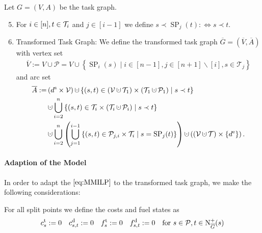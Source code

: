 \begin{definition}
Let $G=(V,A)$ be the task graph.
\begin{enumerate}
	\setcounter{enumi}{4}
	\item{For $i\in[n], t\in\mathcal{T}_i$ and $j\in[i-1]$ we define ${s\prec\operatorname{SP}_j(t):\Leftrightarrow s\prec t}$.}
	\item{Transformed Task Graph: We define the transformed task graph $\overline{G}=\left(\overline{V},\overline{A}\right)$ with vertex set
		\begin{align*}
			\overline{V} := V\cup \mathcal{P} = V\cup\left\{\operatorname{SP}_i(s)\mid i\in[n-1],j\in[n+1]\backslash[i],s\in\mathcal{T}_j\right\}
		\end{align*}
		and arc set
		\begin{align*}
			\overline{A} := & \left(\ds\times\mathcal{V}\right)\cupdot\left\{(s,t)\in\left(\mathcal{V}\cupdot\mathcal{T}_1\right)\times\left( \mathcal{T}_1\cupdot\mathcal{P}_1\right)\mid s\prec t\right\} \\
			& \cupdot\bigcup_{i=2}^n\left\{(s,t)\in\Ti\times\left(\Ti\cupdot \mathcal{P}_i\right)\mid s\prec t\right\} \\
			& \cupdot\bigcup_{i=2}^n\left(\bigcup_{j=1}^{i-1}\left\{(s,t)\in\mathcal{P}_{j,i}\times\Ti\mid s=\operatorname{SP}_j(t)\right\}\right)\cupdot \left(\left(\mathcal{V}\cupdot\mathcal{T}\right)\times\left\{\de\right\}\right).
		\end{align*}}
\end{enumerate}

\end{definition}

\paragraph{Adaption of the Model} \parfill

In order to adapt the $\eqref{eq:MMILP}$ to the transformed task graph, we make the following considerations:

For all split points we define the costs and fuel states as
\begin{align*}
	c^{\operatorname{t}}_s := 0 && c^{\operatorname{d}}_{s,t} := 0 && f^{\operatorname{t}}_s := 0 && f^{\operatorname{d}}_{s,t} := 0 && \text{for } s\in \mathcal{P},t\in\operatorname{N}_{\overline{G}}^+(s)
\end{align*}

